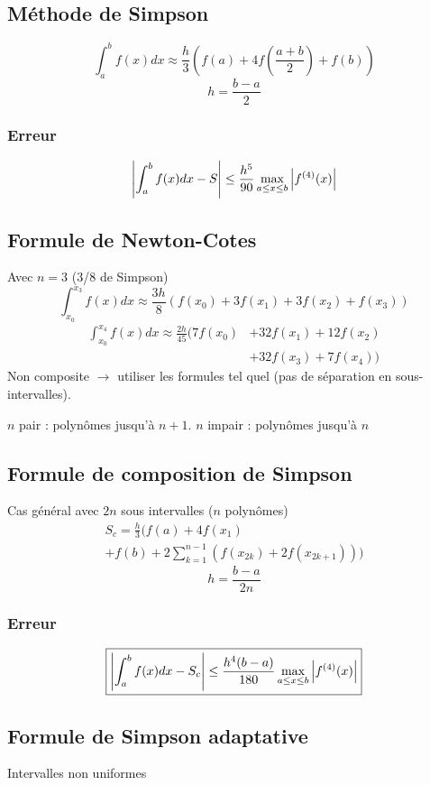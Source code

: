 \documentclass[resume]{subfiles}
\begin{document}
	\subsection{Méthode de Simpson}
	$$\boxed{\int_a^{b}f(x)dx\approx \frac{h}{3}\left(f(a)+4f\left(\frac{a+b}{2}\right)+f(b)\right)}$$
	$$h=\frac{b-a}{2}$$
	\subsubsection{Erreur}
	$$\abs{\int_a^bf(x)dx-S}\leq \frac{h^5}{90}\max_{a\leq x\leq b}\abs{f^{(4)}(x)}$$
	\subsection{Formule de Newton-Cotes}
	Avec $n=3$ (3/8 de Simpson)
	$$\int_{x_0}^{x_3}f(x)dx\approx \frac{3h}{8}\left(f(x_0)+3f(x_1)+3f(x_2)+f(x_3)\right)$$
	\begin{align*}
	\int_{x_0}^{x_4}f(x)dx\approx \frac{2h}{45} \Big(7f(x_0)&+32f(x_1)+12f(x_2)\\ &+32f(x_3)+7f(x_4)\Big)
	\end{align*}
	Non composite $\to$ utiliser les formules tel quel (pas de séparation en sous-intervalles).
	
	
	$n$ pair : polynômes jusqu'à $n+1$. $n$ impair : polynômes jusqu'à $n$
	\subsection{Formule de composition de Simpson}
	Cas général avec $2n$ sous intervalles ($n$ polynômes)
	\begin{multline*}
	S_c=\frac{h}{3}\Big(f(a)+4f(x_1)\\+f(b)+2\sum_{k=1}^{n-1}\left(f(x_{2k})+2f(x_{2k+1})\right)\Big)
	\end{multline*}
		$$h=\frac{b-a}{2n}$$
	\subsubsection{Erreur}
	$$\boxed{\abs{\int_a^bf(x)dx-S_c}\leq \frac{h^4(b-a)}{180}\max_{a\leq x\leq b}\abs{f^{(4)}(x)}}$$

	\subsection{Formule de Simpson adaptative}
	Intervalles non uniformes
\end{document}
